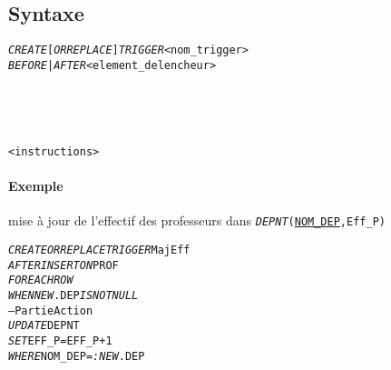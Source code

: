 \documentclass[10pt]{article}
\begin{document}
            \subsection{Syntaxe}
                \begin{alltt}
                    \begin{tabbing}
\emph{CREATE} [\emph{OR REPLACE}] \emph{TRIGGER} <nom_trigger>\\
\emph{BEFORE | AFTER} <element_delencheur> \\
[\emph{FOR EACH ROW}]\\
[\emph{WHEN} <condition>]\\
[\emph{DECLARE} ...]\\
[\emph{BEGIN}]\\
    <instructions>\\
[\emph{END};]
                    \end{tabbing}
                \end{alltt}

                \paragraph{Exemple} mise à jour de l'effectif des professeurs dans \emph{\texttt{DEPNT}}\texttt{(}\underline{\texttt{NOM\_DEP}}\texttt{,Eff\_P)}
                \begin{alltt}
                    \begin{tabbing}
\emph{CREATE OR REPLACE TRIGGER} MajEff\\
\emph{AFTER INSERT ON} PROF\\
\emph{FOR EACH ROW}\\
\emph{WHEN NEW}.DEP \emph{IS NOT NULL}\\
-- Partie Action\\
\emph{UPDATE} DEPNT\\
\emph{SET} EFF_P=EFF_P+1\\
\emph{WHERE} NOM_DEP=\emph{:NEW}.DEP
                    \end{tabbing}
                \end{alltt}
\end{document}

